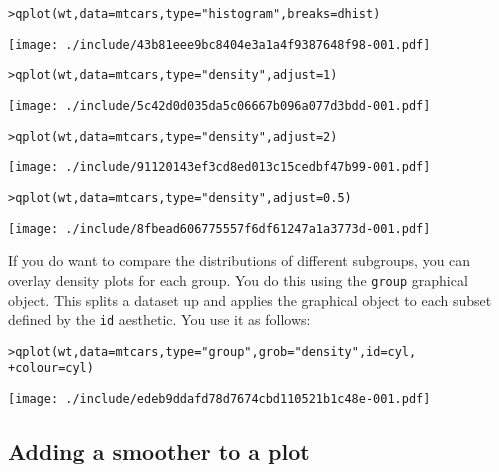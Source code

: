 \begin{alltt}
> qplot(wt, data = mtcars, type = "histogram", breaks = dhist)
\end{alltt}
\texttt{[image: ./include/43b81eee9bc8404e3a1a4f9387648f98-001.pdf]}
\begin{alltt}

> qplot(wt, data = mtcars, type = "density", adjust = 1)
\end{alltt}
\texttt{[image: ./include/5c42d0d035da5c06667b096a077d3bdd-001.pdf]}
\begin{alltt}

> qplot(wt, data = mtcars, type = "density", adjust = 2)
\end{alltt}
\texttt{[image: ./include/91120143ef3cd8ed013c15cedbf47b99-001.pdf]}
\begin{alltt}

> qplot(wt, data = mtcars, type = "density", adjust = 0.5)
\end{alltt}
\texttt{[image: ./include/8fbead606775557f6df61247a1a3773d-001.pdf]}
\begin{alltt}

\end{alltt}

If you do want to compare the distributions of different subgroups, you can overlay density plots for each group. You do this using the {\tt group} graphical object.  This splits a dataset up and applies the graphical object to each subset defined by the {\tt id} aesthetic.  You use it as follows:

\begin{alltt}
> qplot(wt, data = mtcars, type = "group", grob = "density", id = cyl, 
+     colour = cyl)
\end{alltt}
\texttt{[image: ./include/edeb9ddafd78d7674cbd110521b1c48e-001.pdf]}
\begin{alltt}

\end{alltt}

\subsection{Adding a smoother to a plot}\label{sub:smooth}

